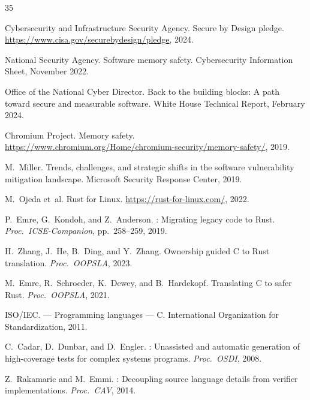 \documentclass[10pt,a4paper]{article}
\begin{document}
\begin{thebibliography}{35}

Cybersecurity and Infrastructure Security Agency.
\newblock Secure by Design pledge.
\newblock \url{https://www.cisa.gov/securebydesign/pledge}, 2024.

National Security Agency.
\newblock Software memory safety.
\newblock Cybersecurity Information Sheet, November 2022.

Office of the National Cyber Director.
\newblock Back to the building blocks: A path toward secure and measurable software.
\newblock White House Technical Report, February 2024.

Chromium Project.
\newblock Memory safety.
\newblock \url{https://www.chromium.org/Home/chromium-security/memory-safety/}, 2019.

M.~Miller.
\newblock Trends, challenges, and strategic shifts in the software vulnerability mitigation landscape.
\newblock Microsoft Security Response Center, 2019.

M.~Ojeda et~al.
\newblock Rust for {Linux}.
\newblock \url{https://rust-for-linux.com/}, 2022.

P.~Emre, G.~Kondoh, and Z.~Anderson.
: Migrating legacy code to {Rust}.
\newblock \emph{Proc.\ ICSE-Companion}, pp.\ 258--259, 2019.

H.~Zhang, J.~He, B.~Ding, and Y.~Zhang.
\newblock Ownership guided {C} to {Rust} translation.
\newblock \emph{Proc.\ OOPSLA}, 2023.

M.~Emre, R.~Schroeder, K.~Dewey, and B.~Hardekopf.
\newblock Translating {C} to safer {Rust}.
\newblock \emph{Proc.\ OOPSLA}, 2021.

{ISO/IEC}.
 --- {P}rogramming languages --- {C}.
\newblock International Organization for Standardization, 2011.

C.~Cadar, D.~Dunbar, and D.~Engler.
: Unassisted and automatic generation of high-coverage tests for complex systems programs.
\newblock \emph{Proc.\ OSDI}, 2008.

Z.~Rakamaric and M.~Emmi.
: Decoupling source language details from verifier implementations.
\newblock \emph{Proc.\ CAV}, 2014.


\end{thebibliography}
\end{document}

